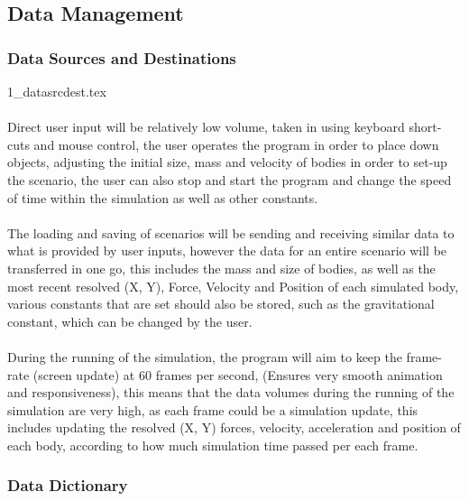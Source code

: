 \subsection{Data Management}
\subsubsection{Data Sources and Destinations}
{1_datasrcdest.tex}
\paragraph{}
Direct user input will be relatively low volume, taken in using keyboard short-cuts and mouse control, the user operates the program in order to place down objects, adjusting the initial size, mass and velocity of bodies in order to set-up the scenario, the user can also stop and start the program and change the speed of time within the simulation as well as other constants.

\paragraph{}
The loading and saving of scenarios will be sending and receiving similar data to what is provided by user inputs, however the data for an entire scenario will be transferred in one go, this includes the mass and size of bodies, as well as the most recent resolved (X, Y), Force, Velocity and Position of each simulated body, various constants that are set should also be stored, such as the gravitational constant, which can be changed by the user.

\paragraph{}
During the running of the simulation, the program will aim to keep the frame-rate (screen update) at 60 frames per second, (Ensures very smooth animation and responsiveness), this means that the data volumes during the running of the simulation are very high, as each frame could be a simulation update, this includes updating the resolved (X, Y) forces, velocity, acceleration and position of each body, according to how much simulation time passed per each frame.

\pagebreak

\subsubsection{Data Dictionary}
